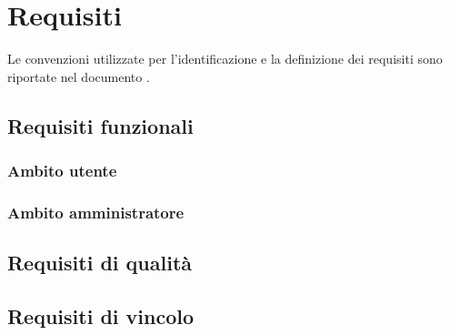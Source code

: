 \section{Requisiti}
Le convenzioni utilizzate per l'identificazione e la definizione dei requisiti sono riportate nel documento \NormeDiProgetto{}. 
\subsection{Requisiti funzionali}
\subsubsection{Ambito utente}
\subsubsection{Ambito amministratore}
\subsection{Requisiti di qualità}
\subsection{Requisiti di vincolo}
